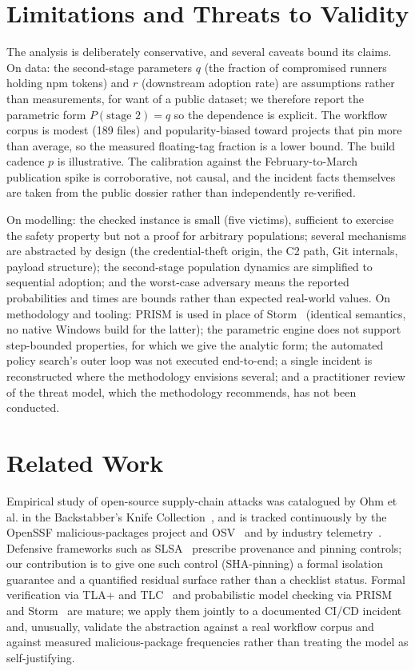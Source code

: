 \documentclass[letterpaper,twocolumn,10pt]{article}
\begin{document}
\section{Limitations and Threats to Validity}
The analysis is deliberately conservative, and several caveats bound its claims. On data: the second-stage parameters $q$ (the fraction of compromised runners holding npm tokens) and $r$ (downstream adoption rate) are assumptions rather than measurements, for want of a public dataset; we therefore report the parametric form $P(\text{stage 2})=q$ so the dependence is explicit. The workflow corpus is modest (189 files) and popularity-biased toward projects that pin more than average, so the measured floating-tag fraction is a lower bound. The build cadence $p$ is illustrative. The calibration against the February-to-March publication spike is corroborative, not causal, and the incident facts themselves are taken from the public dossier rather than independently re-verified.

On modelling: the checked instance is small (five victims), sufficient to exercise the safety property but not a proof for arbitrary populations; several mechanisms are abstracted by design (the credential-theft origin, the C2 path, Git internals, payload structure); the second-stage population dynamics are simplified to sequential adoption; and the worst-case adversary means the reported probabilities and times are bounds rather than expected real-world values. On methodology and tooling: PRISM is used in place of Storm~\cite{storm} (identical semantics, no native Windows build for the latter); the parametric engine does not support step-bounded properties, for which we give the analytic form; the automated policy search's outer loop was not executed end-to-end; a single incident is reconstructed where the methodology envisions several; and a practitioner review of the threat model, which the methodology recommends, has not been conducted.

\section{Related Work}
Empirical study of open-source supply-chain attacks was catalogued by Ohm et al. in the Backstabber's Knife Collection~\cite{backstabber}, and is tracked continuously by the OpenSSF malicious-packages project and OSV~\cite{ossf} and by industry telemetry~\cite{sonatype}. Defensive frameworks such as SLSA~\cite{slsa} prescribe provenance and pinning controls; our contribution is to give one such control (SHA-pinning) a formal isolation guarantee and a quantified residual surface rather than a checklist status. Formal verification via TLA+ and TLC~\cite{lamport} and probabilistic model checking via PRISM~\cite{prism} and Storm~\cite{storm} are mature; we apply them jointly to a documented CI/CD incident and, unusually, validate the abstraction against a real workflow corpus and against measured malicious-package frequencies rather than treating the model as self-justifying.
\end{document}
